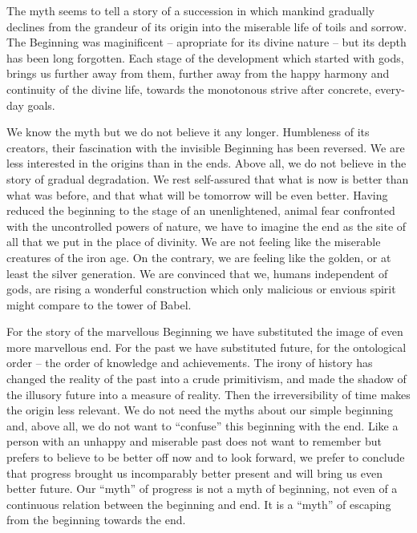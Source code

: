 \noindent 
The myth seems to tell a story of a succession in which mankind gradually declines 
from the grandeur of its origin into the miserable life of toils and sorrow. The Beginning
was maginificent -- apropriate for its divine nature -- but its depth has been
long forgotten. Each stage of the development which started with gods, brings 
us further away from them, further away from the happy
harmony and continuity of the divine life, towards the monotonous strive after
concrete, every-day goals.

We know the myth but we do not believe it any longer. Humbleness of its 
creators, their fascination with the invisible Beginning has been reversed.
We are less interested in the origins than in the ends. 
Above all, we do not believe in the story of gradual degradation. We rest
self-assured that what is now is better than what was before, and that what
will be tomorrow will be even better. 
Having reduced the beginning to the stage of an unenlightened, animal fear
confronted with the uncontrolled powers of nature, we have to imagine the end
as the site of all that we put in the place of divinity.
We 
are not feeling like the miserable creatures of the iron age. On the contrary,
we are feeling like the golden, or at least the silver generation.
We are convinced that we, humans independent of gods, are rising a wonderful 
construction which only malicious or envious spirit might compare to the
tower of Babel.

For the story of the marvellous 
Beginning we have substituted the image of even more marvellous end. 
For the past we have
substituted future, for the ontological order -- the order of knowledge and
achievements. The irony of history has changed the reality of the past into 
a crude primitivism, and made the shadow of the illusory future into a measure
of reality.
Then the irreversibility of time makes the origin less relevant. We
do not need the myths about our simple beginning and, above all, we do not 
want to
``confuse'' this beginning with the end. Like a person with an unhappy and 
miserable past does not want to remember but prefers to believe to be better
off now and to look forward, we prefer to conclude that progress brought us
incomparably better present and will bring us even better future. Our ``myth''
of progress is not a myth of beginning, not even of a continuous relation 
between the beginning and end. It is a ``myth'' of escaping from the beginning 
towards the end.


